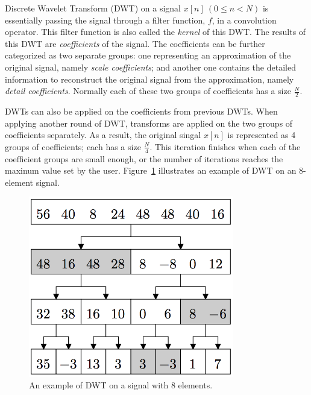 Discrete Wavelet Transform (DWT) on a signal $x[n] \: (0 \leq n < N)$ is essentially
passing the signal through a filter function, $f$, 
in a convolution operator.
%
This filter function is also called the \textit{kernel} of this DWT.
%
The results of this DWT are \textit{coefficients} of the signal.
%
The coefficients can be further categorized as two separate groups: 
one representing an approximation of the original signal,
namely \textit{scale coefficients};
and another one contains the detailed information to reconstruct
the original signal from the approximation, namely 
\textit{detail coefficients}.
%
Normally each of these two groups of coefficients has a size $\frac{N}{2}$.


DWTs can also be applied on the coefficients from previous DWTs.
%
When applying another round of DWT, transforms are applied on the two
groups of coefficients separately.
%
As a result, the original singal $x[n]$ is represented as 4 groups of 
coefficients; each has a size $\frac{N}{4}$.
%
This iteration finishes when each of the coefficient groups are small enough,
or the number of iterations reaches the maxinum value set by the user. 
%
%
%
Figure~\ref{fig:example1} illustrates an example of DWT on an 8-element signal.


\begin{figure}[p]
    \centering
    \includegraphics[width=0.8\textwidth]{fig/example1.png}
    \caption{An example of DWT on a signal with 8 elements.}
    \label{fig:example1}
\end{figure}






